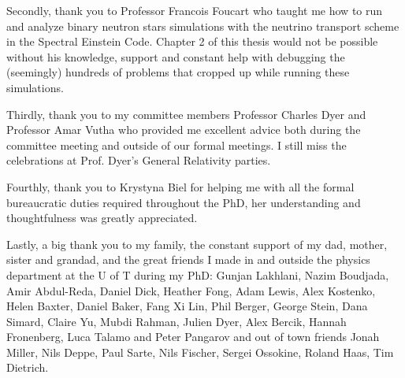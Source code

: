 \begin{preliminary}
\begin{acknowledgements}
Secondly, thank you to Professor Francois Foucart who taught me how to run and analyze binary neutron stars simulations with the neutrino transport scheme in the Spectral Einstein Code. Chapter 2 of this thesis would not be possible without his knowledge, support and constant help with debugging the (seemingly) hundreds of problems that cropped up while running these simulations.

Thirdly, thank you to my committee members Professor Charles Dyer and Professor Amar Vutha who provided me excellent advice both during the committee meeting and outside of our formal meetings. I still miss the celebrations at Prof. Dyer's General Relativity parties.

Fourthly, thank you to Krystyna Biel for helping me with all the formal bureaucratic duties required throughout the PhD, her understanding and thoughtfulness was greatly appreciated. 

Lastly, a big thank you to my family, the constant support of my dad, mother, sister and grandad, and the great friends I made in and outside the physics department at the U of T during my PhD: Gunjan Lakhlani, Nazim Boudjada, Amir Abdul-Reda, Daniel Dick, Heather Fong, Adam Lewis, Alex Kostenko, Helen Baxter, Daniel Baker, Fang Xi Lin, Phil Berger, George Stein, Dana Simard, Claire Yu, Mubdi Rahman, Julien Dyer, Alex Bercik, Hannah Fronenberg, Luca Talamo and Peter Pangarov and out of town friends Jonah Miller, Nils Deppe, Paul Sarte, Nils Fischer, Sergei Ossokine, Roland Haas, Tim Dietrich.


\end{acknowledgements}

\tableofcontents

\listoftables

\listoffigures

\end{preliminary}


